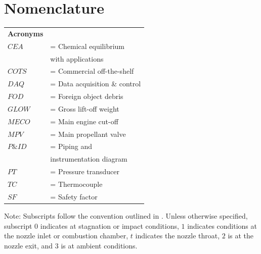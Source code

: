 \documentclass[9pt]{article} %
\numberwithin{equation}{section} %
\begin{document}
\section*{Nomenclature}
\vspace{0.1cm}
\begin{tabular}{ll}
\textbf{Acronyms} \\ 
$CEA $ & = \quad Chemical equilibrium \\ 
$ $ & \qquad \enskip with applications \\
$COTS $ & = \quad Commercial off-the-shelf \\
$DAQ $ & = \quad Data acquisition \& control \\
$FOD $ & = \quad Foreign object debris \\
$GLOW $ & = \quad Gross lift-off weight \\
$MECO$ & = \quad Main engine cut-off \\
$MPV$ & = \quad Main propellant valve \\
$P\&ID $ & = \quad Piping and \\
$ $ & \qquad \enskip instrumentation diagram\\
$PT $ & = \quad Pressure transducer \\
$TC $ & = \quad Thermocouple \\
$SF $ & = \quad Safety factor \\
\end{tabular} 
\vspace{0.2cm} \newline
Note: Subscripts follow the convention outlined in \cite{rpe}. Unless otherwise specified, subscript $0$ indicates at stagnation or impact conditions, $1$ indicates conditions at the nozzle inlet or combustion chamber, $t$ indicates the nozzle throat, $2$ is at the nozzle exit, and $3$ is at ambient conditions.
\end{document}

